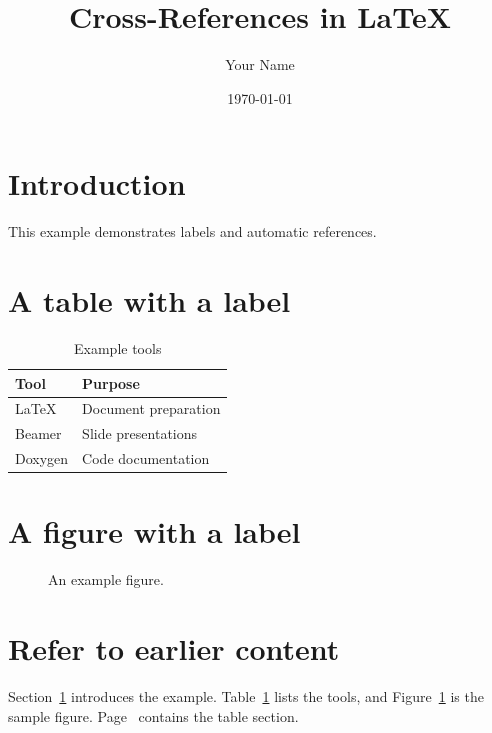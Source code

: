 \documentclass[11pt,a4paper]{article}
\title{Cross-References in LaTeX}
\author{Your Name}
\date{\today}
\begin{document}
\maketitle

\section{Introduction}\label{sec:introduction}
This example demonstrates labels and automatic references.

\section{A table with a label}\label{sec:table}
\begin{table}[ht]
\centering
\caption{Example tools}\label{tab:tools}
\begin{tabular}{ll}
\hline
Tool & Purpose\\
\hline
LaTeX & Document preparation\\
Beamer & Slide presentations\\
Doxygen & Code documentation\\
\hline
\end{tabular}
\end{table}

\section{A figure with a label}\label{sec:figure}
\begin{figure}[ht]
\centering
{}
\caption{An example figure.}\label{fig:example}
\end{figure}

\section{Refer to earlier content}
Section~\ref{sec:introduction} introduces the example. Table~\ref{tab:tools} lists the tools, and Figure~\ref{fig:example} is the sample figure. Page~\pageref{sec:table} contains the table section.
\end{document}
